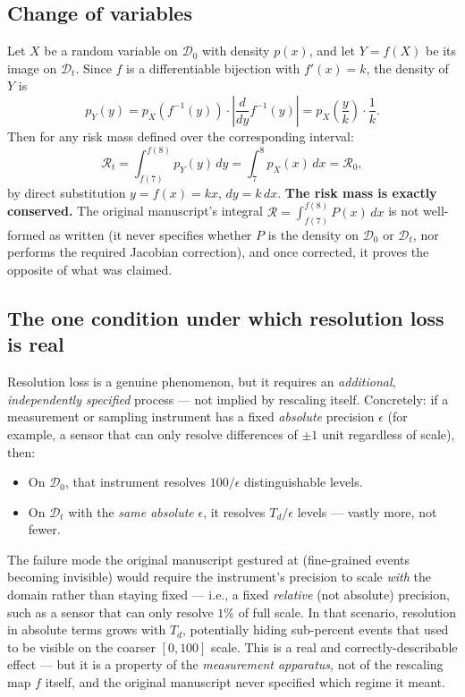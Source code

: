 \documentclass[10pt,journal,compsoc]{IEEEtran}
\begin{document}
\subsection{Change of variables}
Let $X$ be a random variable on $\mathcal{D}_0$ with density $p(x)$, and let $Y = f(X)$ be its image on $\mathcal{D}_t$. Since $f$ is a differentiable bijection with $f'(x) = k$, the density of $Y$ is
\begin{equation}
    p_Y(y) = p_X\!\left(f^{-1}(y)\right)\cdot \left|\frac{d}{dy}f^{-1}(y)\right| = p_X\!\left(\frac{y}{k}\right)\cdot \frac{1}{k}.
\end{equation}
Then for any risk mass defined over the corresponding interval:
\begin{equation}
    \mathcal{R}_t = \int_{f(7)}^{f(8)} p_Y(y)\,dy = \int_{7}^{8} p_X(x)\,dx = \mathcal{R}_0,
\end{equation}
by direct substitution $y = f(x) = kx$, $dy = k\,dx$. \textbf{The risk mass is exactly conserved.} The original manuscript's integral $\mathcal{R} = \int_{f(7)}^{f(8)} P(x)\,dx$ is not well-formed as written (it never specifies whether $P$ is the density on $\mathcal{D}_0$ or $\mathcal{D}_t$, nor performs the required Jacobian correction), and once corrected, it proves the opposite of what was claimed.

\subsection{The one condition under which resolution loss is real}
Resolution loss is a genuine phenomenon, but it requires an \emph{additional, independently specified} process — not implied by rescaling itself. Concretely: if a measurement or sampling instrument has a fixed \emph{absolute} precision $\epsilon$ (for example, a sensor that can only resolve differences of $\pm 1$ unit regardless of scale), then:
\begin{itemize}
    \item On $\mathcal{D}_0$, that instrument resolves $100/\epsilon$ distinguishable levels.
    \item On $\mathcal{D}_t$ with the \emph{same absolute} $\epsilon$, it resolves $T_d/\epsilon$ levels — vastly more, not fewer.
\end{itemize}
The failure mode the original manuscript gestured at (fine-grained events becoming invisible) would require the instrument's precision to scale \emph{with} the domain rather than staying fixed — i.e., a fixed \emph{relative} (not absolute) precision, such as a sensor that can only resolve $1\%$ of full scale. In that scenario, resolution in absolute terms grows with $T_d$, potentially hiding sub-percent events that used to be visible on the coarser $[0,100]$ scale. This is a real and correctly-describable effect — but it is a property of the \emph{measurement apparatus}, not of the rescaling map $f$ itself, and the original manuscript never specified which regime it meant.
\end{document}
